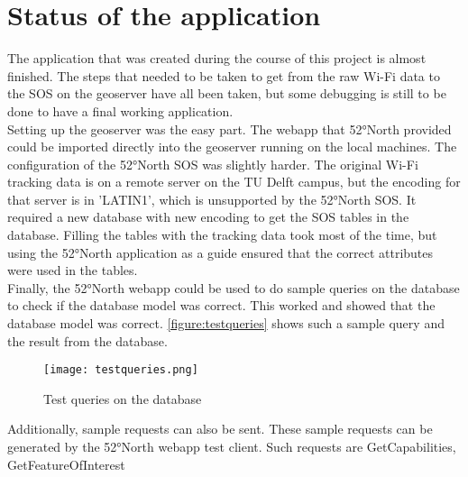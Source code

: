 \chapter{Status of the application}


The application that was created during the course of this project is almost finished. The steps that needed to be taken to get from the raw Wi-Fi data to the SOS on the geoserver have all been taken, but some debugging is still to be done to have a final working application. \\
Setting up the geoserver was the easy part. The webapp that 52°North provided could be imported directly into the geoserver running on the local machines. The configuration of the 52°North SOS was slightly harder. The original Wi-Fi tracking data is on a remote server on the TU Delft campus, but the encoding for that server is in 'LATIN1', which is unsupported by the 52°North SOS. It required a new database with new encoding to get the SOS tables in the database. Filling the tables with the tracking data took most of the time, but using the 52°North application as a guide ensured that the correct attributes were used in the tables. \\
Finally, the 52°North webapp could be used to do sample queries on the database to check if the database model was correct. This worked and showed that the database model was correct. \autoref{figure:testqueries} shows such a sample query and the result from the database. 
\begin{figure}[H]
\centering
\texttt{[image: testqueries.png]}
\captionsetup{justification=centering}
\caption{Test queries on the database}
\label{figure:testqueries}
\end{figure}

Additionally, sample requests can also be sent. These sample requests can be generated by the 52°North webapp test client. Such requests are GetCapabilities, GetFeatureOfInterest

